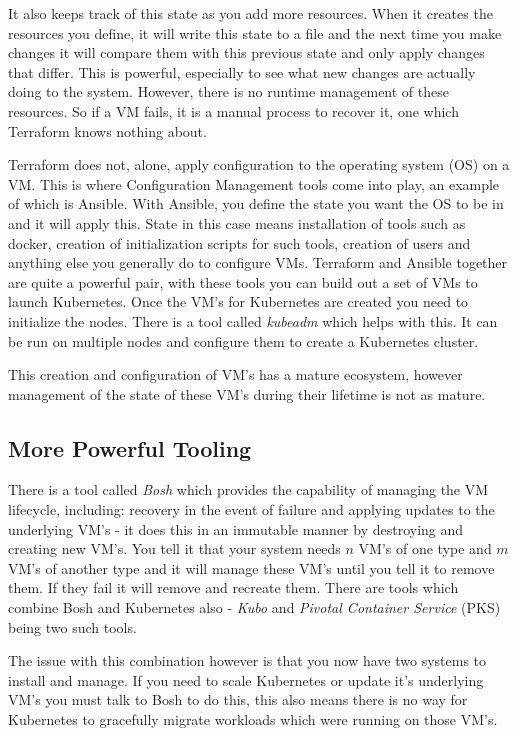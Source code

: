 It also keeps track of this state as you add more resources. When it creates the resources you define, it will write this state to a file and the next time you make changes it will compare them with this previous state and only apply changes that differ. This is powerful, especially to see what new changes are actually doing to the system. However, there is no runtime management of these resources. So if a VM fails, it is a manual process to recover it, one which Terraform knows nothing about.

Terraform does not, alone, apply configuration to the operating system (OS) on a VM. This is where Configuration Management tools come into play, an example of which is Ansible. With Ansible, you define the state you want the OS to be in and it will apply this. State in this case means installation of tools such as docker, creation of initialization scripts for such tools, creation of users and anything else you generally do to configure VMs. Terraform and Ansible together are quite a powerful pair, with these tools you can build out a set of VMs to launch Kubernetes. Once the VM's for Kubernetes are created you need to initialize the nodes. There is a tool called \emph{kubeadm} which helps with this. It can be run on multiple nodes and configure them to create a Kubernetes cluster. 

This creation and configuration of VM's has a mature ecosystem, however management of the state of these VM's during their lifetime is not as mature.

\subsection{More Powerful Tooling}
There is a tool called \emph{Bosh} \cite{bosh} which provides the capability of managing the VM lifecycle, including: recovery in the event of failure and applying updates to the underlying VM's - it does this in an immutable manner by destroying and creating new VM's. You tell it that your system needs $n$ VM's of one type and $m$ VM's of another type and it will manage these VM's until you tell it to remove them. If they fail it will remove and recreate them. There are tools which combine Bosh and Kubernetes also - \emph{Kubo} \cite{kubo} and \emph{Pivotal Container Service} (PKS) \cite{pks} being two such tools. 

The issue with this combination however is that you now have two systems to install and manage. If you need to scale Kubernetes or update it's underlying VM's you must talk to Bosh to do this, this also means there is no way for Kubernetes to gracefully migrate workloads which were running on those VM's. 

